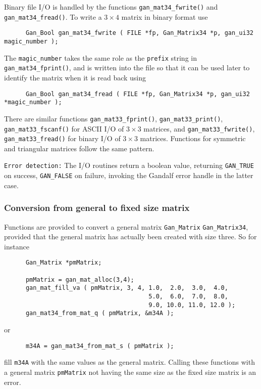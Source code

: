 Binary file I/O is handled by the functions {\tt gan\_mat34\_fwrite()}
and {\tt gan\_mat34\_fread()}. To write a $3\times 4$ matrix in binary
format use
\begin{verbatim}
      Gan_Bool gan_mat34_fwrite ( FILE *fp, Gan_Matrix34 *p, gan_ui32 magic_number );
\end{verbatim}
The {\tt magic\_number} takes the same role as the {\tt prefix} string
in {\tt gan\_mat34\_fprint()}, and is written into the file so that it can be
used later to identify the matrix when it is read back using
\begin{verbatim}
      Gan_Bool gan_mat34_fread ( FILE *fp, Gan_Matrix34 *p, gan_ui32 *magic_number );
\end{verbatim}

There are similar functions {\tt gan\_mat33\_fprint()},
{\tt gan\_mat33\_print()}, {\tt gan\_mat33\_fscanf()} for ASCII I/O of
$3\times 3$ matrices, and {\tt gan\_mat33\_fwrite()}, {\tt gan\_mat33\_fread()}
for binary I/O of $3\times 3$ matrices. Functions for symmetric and
triangular matrices follow the same pattern.

{\tt Error detection:} The I/O routines return a boolean value, returning
{\tt GAN\_TRUE} on success, {\tt GAN\_FALSE} on failure, invoking the Gandalf
error handle in the latter case.

\subsubsection{Conversion from general to fixed size matrix}
Functions are provided to convert a general matrix {\tt Gan\_Matrix}
{\tt Gan\_Matrix34}, provided that the general matrix has actually been
created with size three. So for instance
\begin{verbatim}
      Gan_Matrix *pmMatrix;

      pmMatrix = gan_mat_alloc(3,4);
      gan_mat_fill_va ( pmMatrix, 3, 4, 1.0,  2.0,  3.0,  4.0,
                                        5.0,  6.0,  7.0,  8.0,
                                        9.0, 10.0, 11.0, 12.0 );
      gan_mat34_from_mat_q ( pmMatrix, &m34A );
\end{verbatim}
or
\begin{verbatim}
      m34A = gan_mat34_from_mat_s ( pmMatrix );
\end{verbatim}
fill {\tt m34A} with the same values as the general matrix.
Calling these functions with a general matrix {\tt pmMatrix} not having
the same size as the fixed size matrix is an error.

